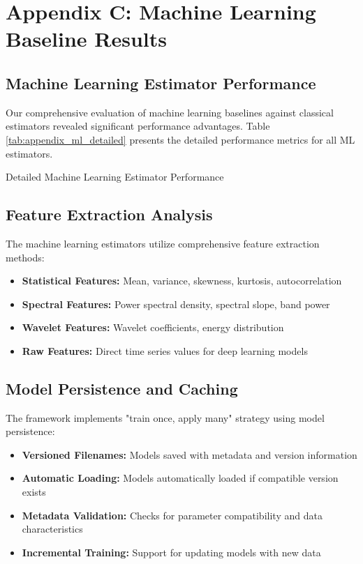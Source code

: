 \section{Appendix C: Machine Learning Baseline Results}

\subsection{Machine Learning Estimator Performance}

Our comprehensive evaluation of machine learning baselines against classical estimators revealed significant performance advantages. Table \ref{tab:appendix_ml_detailed} presents the detailed performance metrics for all ML estimators.

\begin{table}[h]
\centering
\caption{Detailed Machine Learning Estimator Performance}
\label{tab:appendix_ml_detailed}
\end{table}

\subsection{Feature Extraction Analysis}

The machine learning estimators utilize comprehensive feature extraction methods:

\begin{itemize}
    \item \textbf{Statistical Features:} Mean, variance, skewness, kurtosis, autocorrelation
    \item \textbf{Spectral Features:} Power spectral density, spectral slope, band power
    \item \textbf{Wavelet Features:} Wavelet coefficients, energy distribution
    \item \textbf{Raw Features:} Direct time series values for deep learning models
\end{itemize}

\subsection{Model Persistence and Caching}

The framework implements "train once, apply many" strategy using model persistence:

\begin{itemize}
    \item \textbf{Versioned Filenames:} Models saved with metadata and version information
    \item \textbf{Automatic Loading:} Models automatically loaded if compatible version exists
    \item \textbf{Metadata Validation:} Checks for parameter compatibility and data characteristics
    \item \textbf{Incremental Training:} Support for updating models with new data
\end{itemize}

